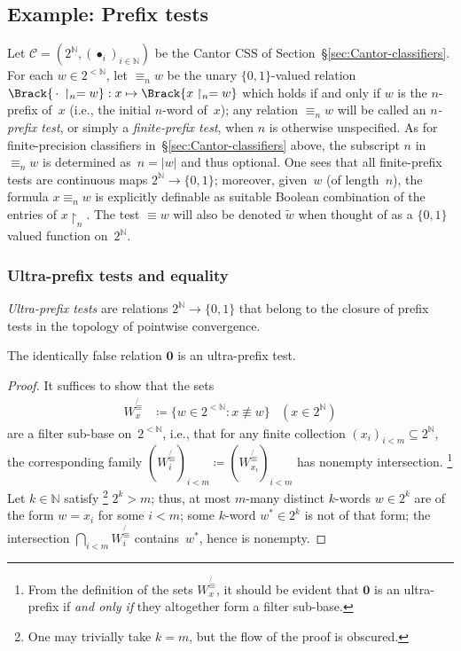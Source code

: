 \subsection{Example: Prefix tests}\label{sec:prefix-test}
Let $\mathcal{C} = (2^{\mathbb{N}},(\bullet_i)_{i\in \mathbb{N}})$ be the Cantor CSS of Section~§\ref{sec:Cantor-classifiers}.
For each $w\in 2^{<\mathbb{N}}$, let ${\equiv}_nw$ be the unary $\{0,1\}$-valued relation $\Brack{\,\cdot\,\restriction_n = w}: x\mapsto\Brack{x\restriction_n = w}$ which holds if and only if $w$ is the $n$-prefix of~$x$ (i.e., the initial $n$-word of~$x$);
any relation ${\equiv}_nw$ will be called an \emph{$n$-prefix test}, or simply a \emph{finite-prefix test}, when $n$ is otherwise unspecified.
As for finite-precision classifiers in~§\ref{sec:Cantor-classifiers} above, the subscript $n$ in ${\equiv}_nw$ is determined as~$n = |w|$ and thus optional.
One sees that all finite-prefix tests are continuous maps $2^{\mathbb{N}}\to\{0,1\}$;
moreover, given~$w$ (of length~$n$), the formula $x\equiv_n\!w$ is explicitly definable as suitable Boolean combination of the entries of $x\restriction_n$.
The test ${\equiv}w$ will also be denoted $\widetilde{w}$ when thought of as a $\{0,1\}$ valued function on~$2^{\mathbb{N}}$.

\subsubsection{Ultra-prefix tests and equality}\label{sec:ultraprefix-tests}
\emph{Ultra-prefix tests} are relations $2^{\mathbb{N}}\to\{0,1\}$ that belong to the closure of prefix tests in the topology of pointwise convergence.

\begin{proposition}\label{prop:zero-ultraprefix}
    The identically false relation $\mathbf{0}$ is an ultra-prefix test.
\end{proposition}
\begin{proof}
    It suffices to show that the sets
    \begin{align*}
        W^{\not{\equiv}}_x &\coloneq \{w\in 2^{<\mathbb{N}}: x\not\equiv w\}&
        (x\in 2^{\mathbb{N}})
    \end{align*}
    are a filter sub-base on~$2^{<\mathbb{N}}$, i.e., that for any finite collection $(x_i)_{i<m} \subseteq 2^{\mathbb{N}}$, the corresponding family $(W^{\not{\equiv}}_i)_{i<m} \coloneq (W^{\not{\equiv}}_{x_i})_{i<m}$ has nonempty intersection.%
    \footnote{From the definition of the sets $W^{\not{\equiv}}_x$, it should be evident that $\mathbf{0}$ is an ultra-prefix if \emph{and only if} they altogether form a filter sub-base.\label{fn:zero-ultraprefix}}
    Let $k\in \mathbb{N}$ satisfy%
    \footnote{One may trivially take $k=m$, but the flow of the proof is obscured.} $2^k>m$; thus, at most $m$-many distinct $k$-words $w\in 2^k$ are of the form $w = x_i$ for some $i<m$; some $k$-word $w^{*}\in 2^k$ is not of that form; the intersection $\bigcap_{i<m}W^{\not{\equiv}}_i$ contains~$w^{*}$, hence is nonempty.
\end{proof}

